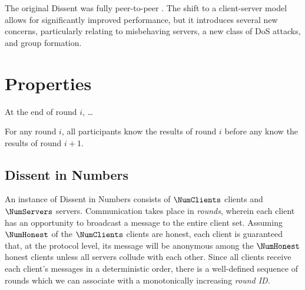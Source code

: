   The original Dissent was fully peer-to-peer
  \cite{p2pd}. The shift to a client-server model
  allows for significantly improved performance, but it introduces several new
  concerns, particularly relating to misbehaving servers, a new class of DoS
  attacks, and group formation.

  \section{Properties}
  \begin{theorem} At the end of round $i$, \ldots {}\end{theorem}
  \begin{theorem} For any round $i$, all participants know the results of round
    $i$ before any know the results of round
    $i+1$.\end{theorem}\label{theorem:rounds}
\subsection{Dissent in Numbers}
An instance of Dissent in Numbers consists of $\NumClients$ clients and
$\NumServers$ servers.  Communication takes place in \emph{rounds}, wherein each
client has an opportunity to broadcast a message to the entire client set.
Assuming $\NumHonest$ of the $\NumClients$ clients are honest, each client is
guaranteed that, at the protocol level, its message will be anonymous among the
$\NumHonest$ honest clients unless all servers collude with each
other. Since all clients receive each client's messages in a
deterministic order, there is a well-defined sequence of rounds which we can
associate with a monotonically increasing \emph{round ID}.

